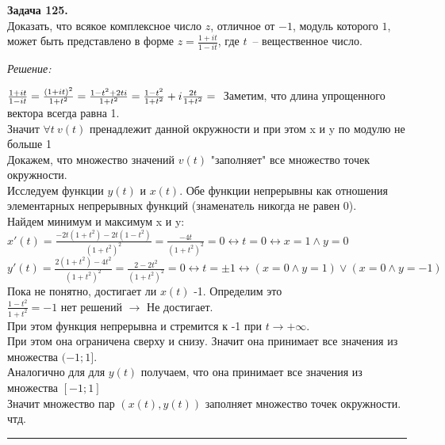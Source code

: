 \documentclass[a4paper, 12pt]{article} %
\newenvironment{problem}[2][Задача]
    { \begin{mdframed}[backgroundcolor=gray!10] \textbf{#1 #2.} \\}
    {  \end{mdframed}}
\newenvironment{solution}
    {\textit{Решение: }}
    {\noindent\rule{7in}{1.5pt}}
\begin{document}
\begin{problem}{125}
Доказать, что всякое комплексное число $z$, отличное от $-1$, модуль которого $1$,
может быть представлено в форме $\displaystyle z=\frac{1+it}{1-it}$, где $t$~-- вещественное число.
\end{problem}
\begin{solution}

$
\frac{1 + it}{1 - it} = \frac{(1 + it)^2}{1 + t^2} = \frac{1 - t^2 + 2ti}{1 + t^2} = \\
\frac{1 - t^2}{1 + t^2} + i\frac{2t}{1 + t^2} = \\
$
Заметим, что длина упрощенного вектора всегда равна 1. \\
Значит $\forall t\ v(t)$ пренадлежит данной окружности и при этом x и y по модулю не больше 1\\
Докажем, что множество значений $v(t)$ "заполняет" все множество точек окружности. \\
Исследуем функции $y(t)$ и $x(t)$. Обе функции непрерывны как отношения элементарных непрерывных функций (знаменатель никогда не равен 0). \\
Найдем минимум и максимум x и y: \\
$
x'(t) = \frac{-2t(1+t^2) - 2t(1-t^2)}{(1+t^2)^2} = \frac{-4t}{(1+t^2)^2} = 0 \leftrightarrow t = 0 \leftrightarrow x = 1 \land y = 0
$ \\
$
y'(t) = \frac{2(1+t^2) - 4t^2}{(1+t^2)^2} = \frac{2-2t^2}{(1+t^2)^2} = 0 \leftrightarrow t = \pm 1 \leftrightarrow (x = 0 \land y = 1) \lor (x = 0 \land y = -1)
$ \\
Пока не понятно, достигает ли $x(t)$ -1. Определим это \\
$\frac{1 - t^2}{1 + t^2} = -1$ нет решений $\rightarrow$ Не достигает. \\
При этом функция непрерывна и стремится к -1 при $t \rightarrow + \infty $. \\
При этом она ограничена сверху и снизу. Значит она принимает все значения из множества $(-1; 1]$. \\
Аналогично для для $y(t)$ получаем, что она принимает все значения из множества $[-1; 1]$ \\
Значит множество пар $(x(t), y(t))$ заполняет множество точек окружности. чтд.

\end{solution}
\end{document}

